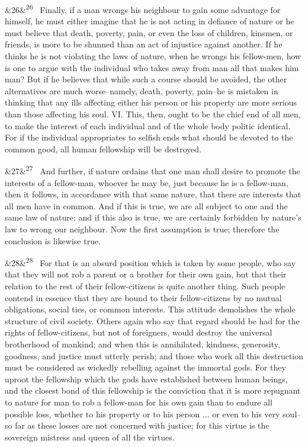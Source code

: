 \documentclass[12pt]{article}
\newcommand{\para}[1][]{\par\noindent\ifx&#1&\else\textsuperscript{\footnotesize #1}~\fi}
\begin{document}
\para[26] Finally, if a man wrongs his neighbour to gain some advantage for himself, he must either imagine that he is not acting in defiance of nature or he must believe that death, poverty, pain, or even the loss of children, kinsmen, or friends, is more to be shunned than an act of injustice against another. If he thinks he is not violating the laws of nature, when he wrongs his fellow-men, how is one to argue with the individual who takes away from man all that makes him man? But if he believes that while such a course should be avoided, the other alternatives are much worse--namely, death, poverty, pain--he is mistaken in thinking that any ills affecting either his person or his property are more serious than those affecting his soul. VI. This, then, ought to be the chief end of all men, to make the interest of each individual and of the whole body politic identical. For if the individual appropriates to selfish ends what should be devoted to the common good, all human fellowship will be destroyed.

\para[27] And further, if nature ordains that one man shall desire to promote the interests of a fellow-man, whoever he may be, just because he is a fellow-man, then it follows, in accordance with that same nature, that there are interests that all men have in common. And if this is true, we are all subject to one and the same law of nature; and if this also is true, we are certainly forbidden by nature's law to wrong our neighbour. Now the first assumption is true; therefore the conclusion is likewise true.

\para[28] For that is an absurd position which is taken by some people, who say that they will not rob a parent or a brother for their own gain, but that their relation to the rest of their fellow-citizens is quite another thing. Such people contend in essence that they are bound to their fellow-citizens by no mutual obligations, social ties, or common interests. This attitude demolishes the whole structure of civil society. Others again who say that regard should be had for the rights of fellow-citizens, but not of foreigners, would destroy the universal brotherhood of mankind; and when this is annihilated, kindness, generosity, goodness, and justice must utterly perish; and those who work all this destruction must be considered as wickedly rebelling against the immortal gods. For they uproot the fellowship which the gods have established between human beings, and the closest bond of this fellowship is the conviction that it is more repugnant to nature for man to rob a fellow-man for his own gain than to endure all possible loss, whether to his property or to his person ... or even to his very soul--so far as these losses are not concerned with justice; for this virtue is the sovereign mistress and queen of all the virtues.
\end{document}
